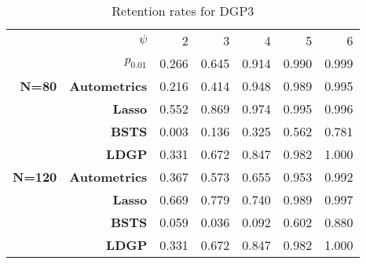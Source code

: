 \documentclass[11pt, oneside]{book}   	%
\begin{document}
\begin{table}[htbp]
  \centering

    \begin{tabular}{rrrrrrr}

          & \boldmath{}\textbf{$\psi$}\unboldmath{} & 2     & 3     & 4     & 5     & 6 \\

          & \textbf{$p_{0.01}$} & 0.266 & 0.645 & 0.914 & 0.990 & 0.999 \\
    \textbf{N=80} & \textbf{Autometrics} & 0.216 & 0.414 & 0.948 & 0.989 & 0.995 \\
    \textbf{} & \textbf{Lasso} & 0.552 & 0.869 & 0.974 & 0.995 & 0.996 \\
    \textbf{} & \textbf{BSTS} & 0.003 & 0.136 & 0.325 & 0.562 & 0.781 \\
    \textbf{} & \textbf{LDGP} & 0.331 & 0.672 & 0.847 & 0.982 & 1.000 \\
    \textbf{N=120} & \textbf{Autometrics} & 0.367 & 0.573 & 0.655 & 0.953 & 0.992 \\
    \textbf{} & \textbf{Lasso} & 0.669 & 0.779 & 0.740 & 0.989 & 0.997 \\
    \textbf{} & \textbf{BSTS} & 0.059 & 0.036 & 0.092 & 0.602 & 0.880 \\
    \textbf{} & \textbf{LDGP} & 0.331 & 0.672 & 0.847 & 0.982 & 1.000 \\

    \end{tabular}%
      \caption{Retention rates for DGP3}
  \label{DGP3RR}%
\end{table}%
\end{document}
